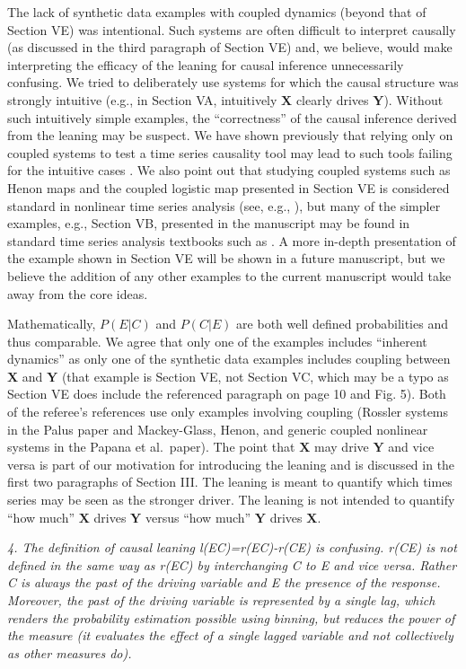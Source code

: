 \documentclass[a4paper,11pt]{article}
\begin{document}
The lack of synthetic data examples with coupled dynamics (beyond that of Section VE) was intentional.  Such systems are often difficult to interpret causally (as discussed in the third paragraph of Section VE) and, we believe, would make interpreting the efficacy of the leaning for causal inference unnecessarily confusing.  We tried to deliberately use systems for which the causal structure was strongly intuitive (e.g., in Section VA, intuitively $\mathbf{X}$ clearly drives $\mathbf{Y}$).  Without such intuitively simple examples, the ``correctness'' of the causal inference derived from the leaning may be suspect.  We have shown previously that relying only on coupled systems to test a time series causality tool may lead to such tools failing for the intuitive cases \cite{Weigel2014}.  We also point out that studying coupled systems such as Henon maps and the coupled logistic map presented in Section VE is considered standard in nonlinear time series analysis (see, e.g., \cite{Kantz2004}), but many of the simpler examples, e.g., Section VB, presented in the manuscript may be found in standard time series analysis textbooks such as \cite{Box2013}.  A more in-depth presentation of the example shown in Section VE will be shown in a future manuscript, but we believe the addition of any other examples to the current manuscript would take away from the core ideas.
 
Mathematically, $P(E|C)$ and $P(C|E)$ are both well defined probabilities and thus comparable.  We agree that only one of the examples includes ``inherent dynamics'' as only one of the synthetic data examples includes coupling between $\mathbf{X}$ and $\mathbf{Y}$ (that example is Section VE, not Section VC, which may be a typo as Section VE does include the referenced paragraph on page 10 and Fig. 5).  Both of the referee's references use only examples involving coupling (Rossler systems in the Palus paper and Mackey-Glass, Henon, and generic coupled nonlinear systems in the Papana et al.\ paper).  The point that $\mathbf{X}$ may drive $\mathbf{Y}$ and vice versa is part of our motivation for introducing the leaning and is discussed in the first two paragraphs of Section III.  The leaning is meant to quantify which times series may be seen as the stronger driver.  The leaning is not intended to quantify ``how much'' $\mathbf{X}$ drives $\mathbf{Y}$ versus ``how much'' $\mathbf{Y}$ drives $\mathbf{X}$. 

\vspace{0.5cm}
{\em 4. The definition of causal leaning l(EC)=r(EC)-r(CE) is confusing.  r(CE) is not defined in the same way as r(EC) by interchanging C to E and vice versa. Rather C is always the past of the driving variable and E the presence of the response. Moreover, the past of the driving variable is represented by a single lag, which renders the probability estimation possible using binning, but reduces the power of the measure (it evaluates the effect of a single lagged variable and not collectively as other measures do).}
\vspace{0.5cm}
\end{document}
